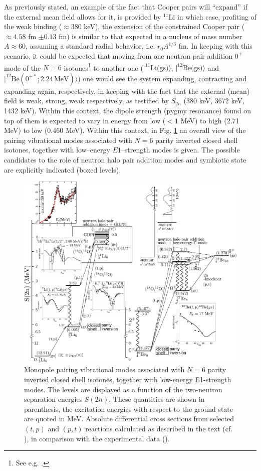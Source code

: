   As previously stated, an example of the fact that Cooper pairs will ``expand'' if the external mean field allows for it, is provided by $^{11}$Li in which case, profiting of the weak binding ($\approx 380$ keV), the extension of the constrained Cooper  pair ($\approx 4.58 $ fm $\pm 0.13$ fm)   is similar to that expected in a nucleus of mass number $A\approx 60$, assuming a standard radial behavior, i.e. $r_0 A^{1/3}$ fm. In keeping with this scenario, it could be expected that moving from one neutron pair addition $0^+$ mode of the $N=6$ isotones\footnote{See e.g. \cite{Gori:04}.} to another one ($|^{11}\text{Li(gs)}\rangle$, $|^{12}\text{Be(gs)}\rangle$ and $|^{12}\text{Be}(0^{+*};2.24\,\text{MeV})\rangle$) one would see the system expanding, contracting and expanding again, respectively, in keeping with the fact that the external (mean) field is weak, strong, weak respectively, as testified by $S_{2n}$ (380 keV, 3672 keV, 1432 keV). Within this context,  the dipole  strength (pygmy resonance) found on top of them is expected to vary in  energy from  low ($<1$ MeV) to high (2.71 MeV) to low (0.460 MeV). 
Within this context, in Fig. \ref{fig3.8.1} an overall view of the pairing vibrational modes associated with $N=6$ parity inverted closed shell isotones, together with low--energy $E1$--strength modes is given. The possible candidates to the role of neutron halo pair addition modes and symbiotic state are explicitly indicated (boxed levels).
   \begin{figure}
   	\centerline{\includegraphics*[width=21cm,angle=90]{nutshell/figs/fig3_8_1_v3}}
   	\caption{Monopole pairing vibrational modes associated with 
   		$N=6$ parity inverted closed shell isotones, together with low-energy E1-strength modes. 
   		The levels are  displayed as a function of the two-neutron separation energies $S(2n)$. 
   		These quantities are shown in parenthesis, the excitation energies with respect to the ground state are quoted in MeV. 
   		Absolute differential cross sections from selected $(t,p)$ and $(p,t)$ reactions calculated as described in the text (cf. \cite{Potel:10,Potel:14}), 
   		in comparison with the experimental data (\cite{Young:71,Fortune:94}).}\label{fig3.8.1}
   \end{figure}
